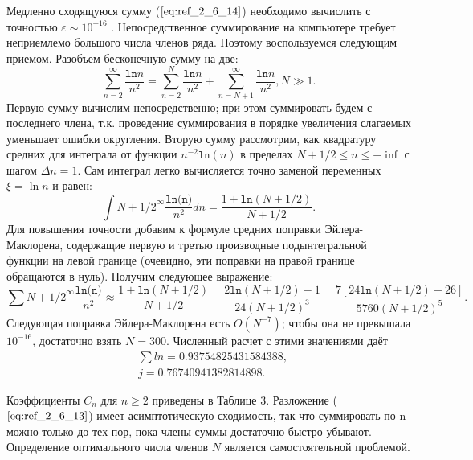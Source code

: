 Медленно сходящуюся сумму ($\ref{eq:ref_2_6_14}$) необходимо вычислить с точностью $\varepsilon \sim 10^{-16}$ .
Непосредственное суммирование на компьютере требует неприемлемо
большого числа членов ряда. Поэтому воспользуемся следующим приемом.
Разобъем бесконечную сумму на две:
\begin{equation}
\sum\limits_{n=2}^{\infty} \frac{\texttt{ln}n}{n^2} = \sum\limits_{n=2}^{N} \frac{\texttt{ln}n}{n^2} + \sum\limits_{n=N+1}^{\infty} \frac{\texttt{ln}n}{n^2}, N \gg 1.
\label{eq:ref_2_6_15}
\end{equation}
Первую сумму вычислим непосредственно; при этом суммировать будем с
последнего члена, т.к. проведение суммирования в порядке увеличения
слагаемых уменьшает ошибки округления. Вторую сумму рассмотрим, как
квадратуру средних для интеграла от функции $n^{-2}\texttt{ln}(n)$ в пределах
$N + 1/ 2 \leqslant n \leqslant +\inf$ с шагом $\Delta n=1$. Сам интеграл легко вычисляется точно
заменой переменных $\xi=\ln n $ и равен:
\begin{equation}
\int\limits{N+1/2}^{\infty} \frac{\texttt{ln(n)}}{n^2} dn = \frac{1+\texttt{ln}(N + 1/2)}{N + 1/2}.
\label{eq:ref_2_6_16}
\end{equation}
Для повышения точности добавим к формуле средних поправки Эйлера-
Маклорена, содержащие первую и третью производные подынтегральной
функции на левой границе (очевидно, эти поправки на правой границе
обращаются в нуль). Получим следующее выражение:
\begin{equation}
\sum\limits{N+1/2}^{\infty} \frac{\texttt{ln(n)}}{n^2} \approx \frac{1+\texttt{ln}(N+1/2)}{N+1/2} - \frac{2\texttt{ln}(N+1/2)-1}{24(N+1/2)^3} + \frac{7[24\texttt{ln}(N+1/2) - 26]}{5760(N+1/2)^5}.
\label{eq:ref_2_6_17}
\end{equation}
Следующая поправка Эйлера-Маклорена есть $O(N^{-7})$; чтобы она не превышала
$10^{-16}$, достаточно взять $N = 300$. Численный расчет с этими значениями даёт
\begin{equation}
\begin{aligned}
&\sum ln = 0.93754825431584388, \\
&j = 0.76740941382814898.
\end{aligned}
\label{eq:ref_2_6_18}
\end{equation}

Коэффициенты $C_n$ для $n \geqslant 2$ приведены в Таблице 3. Разложение ($\ref{eq:ref_2_6_13}$)
имеет асимптотическую сходимость, так что суммировать по n можно только
до тех пор, пока члены суммы достаточно быстро убывают. Определение
оптимального числа членов $N$ является самостоятельной проблемой.
